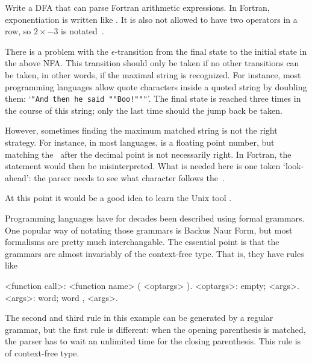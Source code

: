 \begin{594exercise}
Write a DFA that can parse Fortran arithmetic expressions. In Fortran,
exponentiation is written like . It is also not allowed to
have two operators in a row, so $2\times-3$ is notated~.
\end{594exercise}

There is a problem with the $\epsilon$-transition from the final state
to the initial state in the above NFA. This transition should only be
taken if no other transitions can be taken, in other words, if the
maximal string is recognized. For instance, most programming languages
allow quote characters inside a quoted string by doubling them:
`\verb+"And then he said ""Boo!"""+'. The final state is reached three
times in the course of this string; only the last time should the jump
back be taken.

However, sometimes finding the maximum matched string is not the right
strategy. For instance, in most languages,  is a floating
point number, but matching the~ after the decimal point is not
necessarily right. In Fortran, the statement 
would then be misinterpreted. What is needed here is one token
`look-ahead': the parser needs to see what
character follows the~.

At this point it would be a good idea to learn the Unix tool \lex.


Programming languages have for decades been described using formal
grammars. One popular way of notating those grammars is Backus Naur
Form, but most formalisms are pretty much interchangable. The
essential point is that the grammars are almost invariably of the
context-free type. That is, they have rules like
\begin{bnf}
<function call>: <function name> ( <optargs> ).
<optargs>: empty; <args>.
<args>: word; word , <args>.
\end{bnf}
The second and third rule in this example can be generated by a
regular grammar, but the first rule is different: when the opening
parenthesis is matched, the parser has to wait an unlimited time for
the closing parenthesis. This rule is of context-free type\checkthis.

